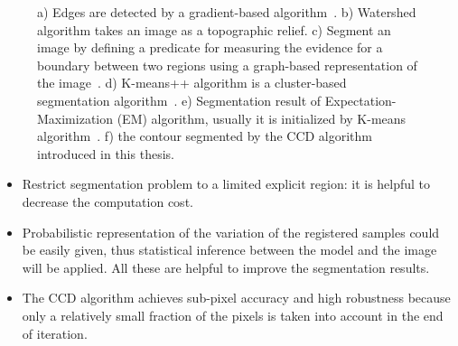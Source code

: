 \begin{figure}[htbp]
\begin{minipage}[t]{0.5\linewidth}
  \end{minipage} 
  \begin{minipage}[t]{0.5\linewidth} 
    \centering 
  \end{minipage}
  \begin{minipage}[t]{0.5\linewidth} 
    \centering 
  \end{minipage}%
\caption[Resulting images after applying some segmentation methods]{a)
  Edges are detected by a gradient-based algorithm~\cite{scharr2000optimal}. b) Watershed algorithm takes an image as a
  topographic relief. c) Segment an image by defining a predicate for
  measuring the evidence for a boundary between two regions using a
  graph-based representation of the
  image~\cite{felzenszwalb2004efficient}. d) K-means++ algorithm is a
  cluster-based segmentation algorithm~\cite{arthur2007k}. e)
  Segmentation result of Expectation-Maximization (EM) algorithm,
  usually it is initialized by K-means algorithm~\cite{bishop2006pattern}. f) the contour segmented by the CCD
  algorithm introduced in this thesis.}
\label{fig:seg_comparison}
\end{figure}

\begin{itemize}
\item Restrict segmentation problem to a limited explicit region: it is helpful
  to decrease the computation cost.
\item Probabilistic representation of the variation of the registered
  samples could be easily given, thus statistical inference between
  the model and the image will be applied. All these are helpful to
  improve the segmentation results.
\item The CCD algorithm achieves sub-pixel accuracy and high
  robustness because only a relatively small fraction of the pixels is
  taken into account in the end of iteration.
\end{itemize}

